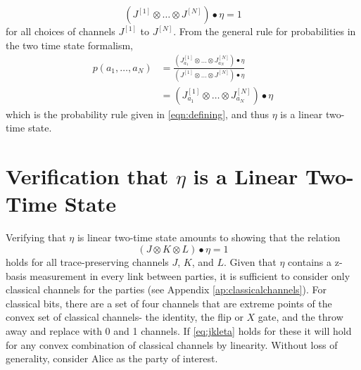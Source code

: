 \documentclass[aps,pra, twocolumn]{revtex4-1}
\begin{document}
\begin{equation} 
(J^{[1]} \otimes \ldots \otimes  J^{[N]}) \bullet  \eta =1
\end{equation} 
for all choices of channels $J^{[1]}$ to $J^{[N]}$. From the general rule for probabilities in the two time state formalism,
\begin{align}
p(a_1, \ldots ,a_N) &= \frac{(J^{[1]}_{a_1} \otimes \ldots \otimes  J^{[N]}_{a_N}) \bullet  \eta}{(J^{[1]} \otimes \ldots \otimes  J^{[N]}) \bullet  \eta } \nonumber \\
& = (J^{[1]}_{a_1} \otimes \ldots \otimes  J^{[N]}_{a_N}) \bullet  \eta
\end{align} 
which is the probability rule given in \eqref{eqn:defining}, and thus $\eta$ is a linear two-time state.  




\section{Verification that $\eta$ is a Linear Two-Time State}
\label{append:etaistwotime}
Verifying that $\eta$ is linear two-time state amounts to showing that the relation 
\begin{equation} \label{eq:jkleta} 
(J \otimes  K \otimes  L )\bullet  \eta =1
\end{equation}
holds for all  trace-preserving channels $J$, $K$, and $L$. Given that $\eta$ contains a z-basis measurement in every link between parties, it is sufficient to consider only classical channels for the parties (see Appendix \ref{ap:classicalchannels}). For classical bits, there are a set of four channels that are extreme points of the convex set of classical channels- the identity, the flip or $X$ gate, and the throw away and replace with 0 and 1 channels. If \eqref{eq:jkleta}  holds for these it will hold for any convex combination of classical channels by linearity. Without loss of generality, consider Alice as the party of interest.
\end{document}
